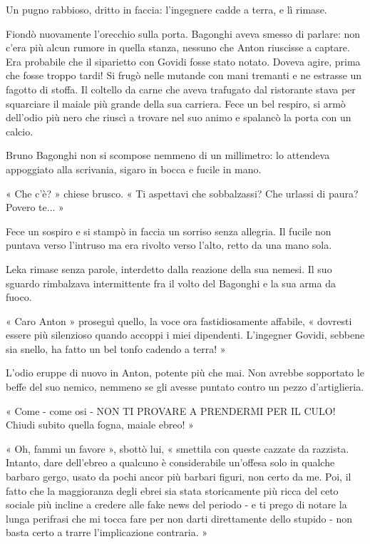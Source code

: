 Un pugno rabbioso, dritto in faccia: l'ingegnere cadde a terra, e lì rimase.

Fiondò nuovamente l'orecchio sulla porta. Bagonghi aveva smesso di parlare: non c'era più alcun rumore in quella stanza, nessuno che Anton riuscisse a captare. Era probabile che il siparietto con Govidi fosse stato notato. Doveva agire, prima che fosse troppo tardi! Si frugò nelle mutande con mani tremanti e ne estrasse un fagotto di stoffa. Il coltello da carne che aveva trafugato dal ristorante stava per squarciare il maiale più grande della sua carriera. Fece un bel respiro, si armò dell'odio più nero che riuscì a trovare nel suo animo e spalancò la porta con un calcio.

Bruno Bagonghi non si scompose nemmeno di un millimetro: lo attendeva appoggiato alla scrivania, sigaro in bocca e fucile in mano.

« Che c'è? » chiese brusco. « Ti aspettavi che sobbalzassi? Che urlassi di paura? Povero te... »

Fece un sospiro e si stampò in faccia un sorriso senza allegria. Il fucile non puntava verso l'intruso ma era rivolto verso l'alto, retto da una mano sola.

Leka rimase senza parole, interdetto dalla reazione della sua nemesi. Il suo sguardo rimbalzava intermittente fra il volto del Bagonghi e la sua arma da fuoco.

« Caro Anton » proseguì quello, la voce ora fastidiosamente affabile, « dovresti essere più silenzioso quando accoppi i miei dipendenti. L'ingegner Govidi, sebbene sia snello, ha fatto un bel tonfo cadendo a terra! »

L'odio eruppe di nuovo in Anton, potente più che mai. Non avrebbe sopportato le beffe del suo nemico, nemmeno se gli avesse puntato contro un pezzo d'artiglieria.

« Come - come osi - NON TI PROVARE A PRENDERMI PER IL CULO! Chiudi subito quella fogna, maiale ebreo! »

« Oh, fammi un favore », sbottò lui, « smettila con queste cazzate da razzista. Intanto, dare dell'ebreo a qualcuno è considerabile un'offesa solo in qualche barbaro gergo, usato da pochi ancor più barbari figuri, non certo da me. Poi, il fatto che la maggioranza degli ebrei sia stata storicamente più ricca del ceto sociale più incline a credere alle fake news del periodo - e ti prego di notare la lunga perifrasi che mi tocca fare per non darti direttamente dello stupido - non basta certo a trarre l'implicazione contraria. »

